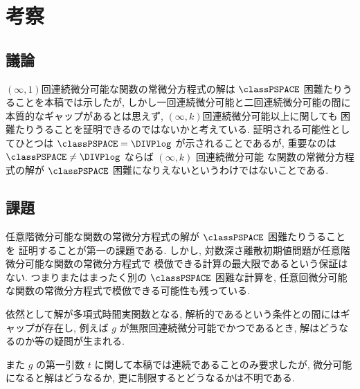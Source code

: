 \section{考察}


\subsection{議論}
$(\infty, 1)$回連続微分可能な関数の常微分方程式の解は $\classPSPACE$ 困難たりうることを本稿では示したが,
しかし一回連続微分可能と二回連続微分可能の間に本質的なギャップがあるとは思えず,
$(\infty, k)$回連続微分可能以上に関しても \PSPACE 困難たりうることを証明できるのではないかと考えている.
証明される可能性としてひとつは $\classPSPACE = \DIVPlog$ が示されることであるが,
重要なのは $\classPSPACE \not = \DIVPlog$ ならば $(\infty, k)$ 回連続微分可能
な関数の常微分方程式の解が $\classPSPACE$ 困難になりえないというわけではないことである.


\subsection{課題}

任意階微分可能な関数の常微分方程式の解が $\classPSPACE$ 困難たりうることを
証明することが第一の課題である.
しかし, 対数深さ離散初期値問題が任意階微分可能な関数の常微分方程式で
模倣できる計算の最大限であるという保証はない.
つまりまたはまったく別の $\classPSPACE$ 困難な計算を,
任意回微分可能な関数の常微分方程式で模倣できる可能性も残っている.

依然として解が多項式時間実関数となる, 解析的であるという条件との間にはギャップが存在し,
例えば $g$ が無限回連続微分可能でかつであるとき, 解はどうなるのか等の疑問が生まれる.

また $g$ の第一引数 $t$ に関して本稿では連続であることのみ要求したが,
微分可能になると解はどうなるか, 更に制限するとどうなるかは不明である.



